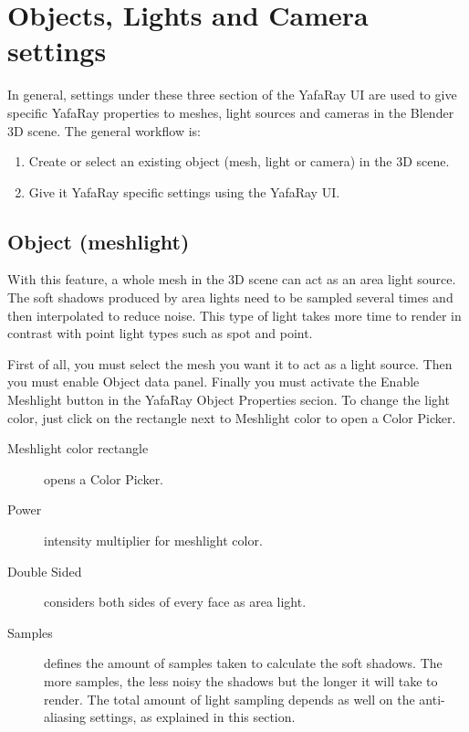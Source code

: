 \chapter{Objects, Lights and Camera settings}
In general, settings under these three section of the YafaRay UI are used to give specific YafaRay properties to meshes, light sources and cameras in the Blender 3D scene. The general workflow is:
\begin{enumerate}
\item Create or select an existing object (mesh, light or camera) in the 3D scene.
\item Give it YafaRay specific settings using the YafaRay UI.
\end{enumerate}

\section{Object (meshlight)}
With this feature, a whole mesh in the 3D scene can act as an area light source. The soft shadows produced by area lights need to be sampled several times and then interpolated to reduce noise. This type of light takes more time to render in contrast with point light types such as spot and point.

First of all, you must select the mesh you want it to act as a light source. Then you must enable Object data panel. Finally you must activate the Enable Meshlight button in the YafaRay Object Properties secion. To change the light color, just click on the rectangle next to Meshlight color to open a Color Picker.

\begin{description}
\item[Meshlight color rectangle] opens a Color Picker.
\item[Power] intensity multiplier for meshlight color.
\item[Double Sided] considers both sides of every face as area light.
\item[Samples] defines the amount of samples taken to calculate the soft shadows. The more samples, the less noisy the shadows but the longer it will take to render. The total amount of light sampling depends as well on the anti-aliasing settings, as explained in this section.
\end{description}



